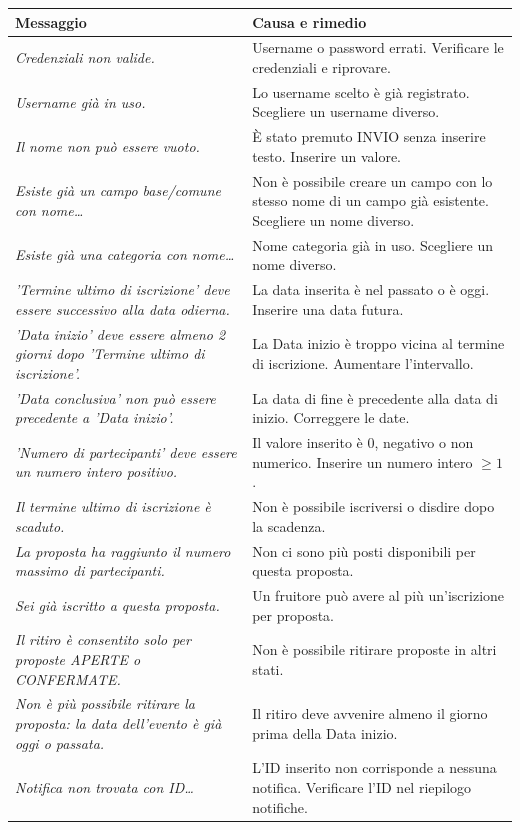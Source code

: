 \documentclass[12pt,a4paper,oneside]{report}
\begin{document}
\begin{longtable}{L{5.5cm}L{7.5cm}}
\toprule
\textbf{Messaggio} & \textbf{Causa e rimedio} \\
\midrule
\endhead
\textit{Credenziali non valide.} & Username o password errati. Verificare le credenziali e riprovare. \\[4pt]
\textit{Username già in uso.} & Lo username scelto è già registrato. Scegliere un username diverso. \\[4pt]
\textit{Il nome non può essere vuoto.} & È stato premuto INVIO senza inserire testo. Inserire un valore. \\[4pt]
\textit{Esiste già un campo base/comune con nome…} & Non è possibile creare un campo con lo stesso nome di un campo già esistente. Scegliere un nome diverso. \\[4pt]
\textit{Esiste già una categoria con nome…} & Nome categoria già in uso. Scegliere un nome diverso. \\[4pt]
\textit{'Termine ultimo di iscrizione' deve essere successivo alla data odierna.} & La data inserita è nel passato o è oggi. Inserire una data futura. \\[4pt]
\textit{'Data inizio' deve essere almeno 2 giorni dopo 'Termine ultimo di iscrizione'.} & La Data inizio è troppo vicina al termine di iscrizione. Aumentare l'intervallo. \\[4pt]
\textit{'Data conclusiva' non può essere precedente a 'Data inizio'.} & La data di fine è precedente alla data di inizio. Correggere le date. \\[4pt]
\textit{'Numero di partecipanti' deve essere un numero intero positivo.} & Il valore inserito è 0, negativo o non numerico. Inserire un numero intero $\geq 1$. \\[4pt]
\textit{Il termine ultimo di iscrizione è scaduto.} & Non è possibile iscriversi o disdire dopo la scadenza. \\[4pt]
\textit{La proposta ha raggiunto il numero massimo di partecipanti.} & Non ci sono più posti disponibili per questa proposta. \\[4pt]
\textit{Sei già iscritto a questa proposta.} & Un fruitore può avere al più un'iscrizione per proposta. \\[4pt]
\textit{Il ritiro è consentito solo per proposte APERTE o CONFERMATE.} & Non è possibile ritirare proposte in altri stati. \\[4pt]
\textit{Non è più possibile ritirare la proposta: la data dell'evento è già oggi o passata.} & Il ritiro deve avvenire almeno il giorno prima della Data inizio. \\[4pt]
\textit{Notifica non trovata con ID…} & L'ID inserito non corrisponde a nessuna notifica. Verificare l'ID nel riepilogo notifiche. \\[4pt]
\bottomrule
\end{longtable}
\end{document}
